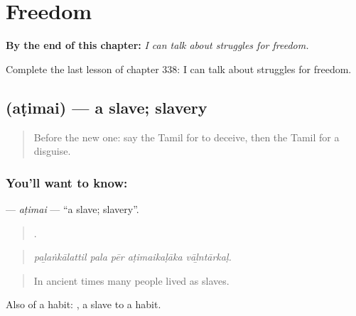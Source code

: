 
\chapter{Freedom}
\label{ch:ta-freedom}

\begin{chapteropening}
\textbf{By the end of this chapter:} \emph{I can talk about struggles for freedom.}

Complete the last lesson of chapter 338: I can talk about struggles for freedom.
\end{chapteropening}

\section[\texorpdfstring{\ta{அடிமை} (aṭimai)}{அடிமை (aṭimai)}]{ (aṭimai) — a slave; slavery}

\label{lesson:TA-C338-atimai}



\begin{quote}
Before the new one: say the Tamil for to deceive, then the Tamil for a disguise.
\end{quote}

\subsection*{You'll want to know: }
\textbf{} — \emph{aṭimai} — \textquotedblleft{}a slave; slavery\textquotedblright{}.

\begin{quote}
    .
\end{quote}

\begin{quote}
\emph{paḻaṅkālattil pala pēr aṭimaikaḷāka vāḻntārkaḷ.}
\end{quote}

\begin{quote}
In ancient times many people lived as slaves.
\end{quote}

Also of a habit:  , a slave to a habit.

